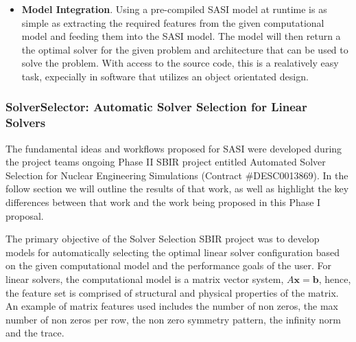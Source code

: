 \begin{itemize}
 \item { \bf Model Integration}. Using a pre-compiled SASI model at runtime is as simple as extracting the required features from the given computational model and feeding them into the SASI model. The model will then return a the optimal solver for the given problem and architecture that can be used to solve the problem.   With access to the source code, this is a realatively easy task, expecially in software that utilizes an object orientated design. 
\end{itemize}

\subsubsection{SolverSelector: Automatic Solver Selection for Linear Solvers} 
\label{sec:linearsolvers}

The fundamental ideas and workflows proposed for SASI were developed during the project teams ongoing Phase II SBIR project entitled Automated Solver Selection for Nuclear Engineering Simulations (Contract \#DESC0013869). In the follow section we will outline the results of that work, as well as highlight the key differences between that work and the work being proposed in this Phase I proposal.  

The primary objective of the Solver Selection SBIR project was to develop models for automatically selecting the optimal linear solver configuration based on the given computational model and the performance goals of the user. For linear solvers, the computational model is a matrix vector system, $A\mathbf{x} = \mathbf{b}$, hence, the feature set is comprised of structural and physical properties of the matrix. An example of matrix features used includes the number of non zeros, the max number of non zeros per row, the non zero symmetry pattern, the infinity norm and the trace.  

%

